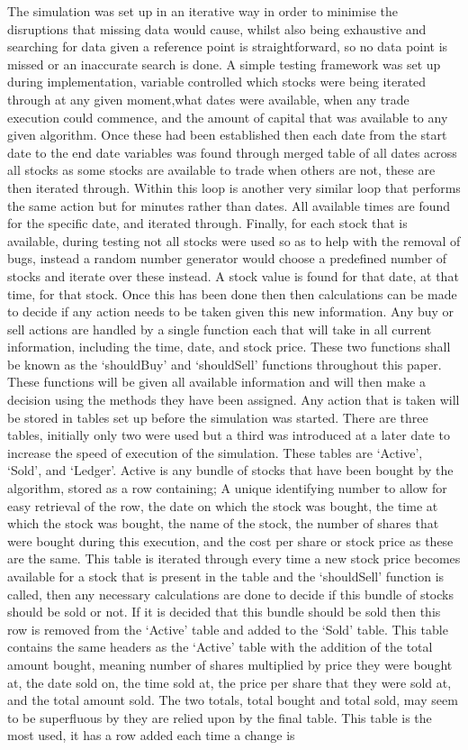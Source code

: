\documentclass[12pt,a4paper]{article}
\begin{document}
\iffalse
The simulation was set up in an iterative way in order to minimise the disruptions that missing data would cause, whilst also being exhaustive and searching for data given a reference point is straightforward, so no data point is missed or an inaccurate search is done. A simple testing framework was set up during implementation, variable controlled which stocks were being iterated through at any given moment,what dates were available, when any trade execution could commence, and the amount of capital that was available to any given algorithm. Once these had been established then each date from the start date to the end date variables was found through merged table of all dates across all stocks as some stocks are available to trade when others are not, these are then iterated through. Within this loop is another very similar loop that performs the same action but for minutes rather than dates. All available times are found for the specific date, and iterated through. Finally, for each stock that is available, during testing not all stocks were used so as to help with the removal of bugs, instead a random number generator would choose a predefined number of stocks and iterate over these instead. A stock value is found for that date, at that time, for that stock. Once this has been done then then calculations can be made to decide if any action needs to be taken given this new information. Any buy or sell actions are handled by a single function each that will take in all current information, including the time, date, and stock price. These two functions shall be known as the `shouldBuy' and `shouldSell' functions throughout this paper. These functions will be given all available information and will then make a decision using the methods they have been assigned. Any action that is taken will be stored in tables set up before the simulation was started. There are three tables, initially only two were used but a third was introduced at a later date to increase the speed of execution of the simulation. These tables are `Active', `Sold', and `Ledger'. Active is any bundle of stocks that have been bought by the algorithm, stored as a row containing; A unique identifying number to allow for easy retrieval of the row, the date on which the stock was bought, the time at which the stock was bought, the name of the stock, the number of shares that were bought during this execution, and the cost per share or stock price as these are the same. This table is iterated through every time a new stock price becomes available for a stock that is present in the table and the `shouldSell' function is called, then any necessary calculations are done to decide if this bundle of stocks should be sold or not. If it is decided that this bundle should be sold then this row is removed from the `Active' table and added to the `Sold' table. This table contains the same headers as the `Active' table with the addition of the total amount bought, meaning number of shares multiplied by price they were bought at, the date sold on, the time sold at, the price per share that they were sold at, and the total amount sold. The two totals, total bought and total sold, may seem to be superfluous by they are relied upon by the final table. This table is the most used, it has a row added each time a change is 
\end{document}
